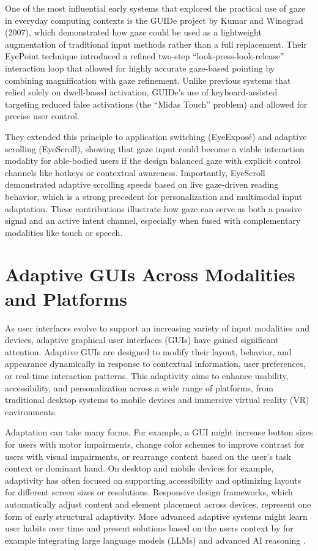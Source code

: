 \documentclass[openany]{book}
\begin{document}
One of the most influential early systems that explored the practical use of gaze in everyday computing contexts is the GUIDe project by Kumar and Winograd (2007), which demonstrated how gaze could be used as a lightweight augmentation of traditional input methods rather than a full replacement. Their EyePoint technique introduced a refined two-step “look-press-look-release” interaction loop that allowed for highly accurate gaze-based pointing by combining magnification with gaze refinement. Unlike previous systems that relied solely on dwell-based activation, GUIDe’s use of keyboard-assisted targeting reduced false activations (the “Midas Touch” problem) and allowed for precise user control.

They extended this principle to application switching (EyeExposé) and adaptive scrolling (EyeScroll), showing that gaze input could become a viable interaction modality for able-bodied users if the design balanced gaze with explicit control channels like hotkeys or contextual awareness. Importantly, EyeScroll demonstrated adaptive scrolling speeds based on live gaze-driven reading behavior, which is a strong precedent for personalization and multimodal input adaptation. These contributions illustrate how gaze can serve as both a passive signal and an active intent channel, especially when fused with complementary modalities like touch or speech.

\section{Adaptive GUIs Across Modalities and Platforms}
As user interfaces evolve to support an increasing variety of input modalities and devices, adaptive graphical user interfaces (GUIs) have gained significant attention. Adaptive GUIs are designed to modify their layout, behavior, and appearance dynamically in response to contextual information, user preferences, or real-time interaction patterns. This adaptivity aims to enhance usability, accessibility, and personalization across a wide range of platforms, from traditional desktop systems to mobile devices and immersive virtual reality (VR) environments.

Adaptation can take many forms. For example, a GUI might increase button sizes for users with motor impairments, change color schemes to improve contrast for users with visual impairments, or rearrange content based on the user's task context or dominant hand. On desktop and mobile devices for example, adaptivity has often focused on supporting accessibility and optimizing layouts for different screen sizes or resolutions. Responsive design frameworks, which automatically adjust content and element placement across devices, represent one form of early structural adaptivity. More advanced adaptive systems might learn user habits over time and present solutions based on the users context by for example integrating large language models (LLMs) and advanced AI reasoning \cite{Gajos2008SUPPLE}.
\end{document}
